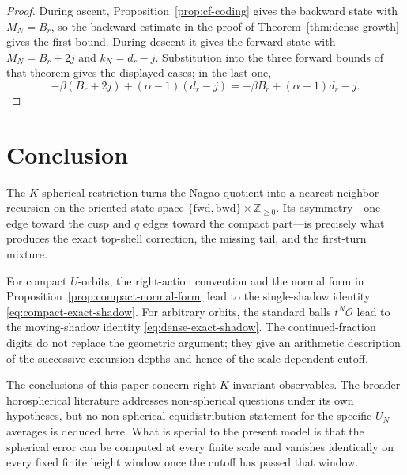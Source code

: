 \documentclass[11pt]{amsart}
\theoremstyle{definition}
\theoremstyle{plain}
\newcommand{\cO}{\mathcal O}
\newcommand{\ZZ}{\mathbb Z}
\newcommand{\fwd}{\mathrm{fwd}}
\newcommand{\bwd}{\mathrm{bwd}}
\begin{document}
\begin{proof}
During ascent, Proposition~\ref{prop:cf-coding} gives the backward state with
\(M_N=B_r\), so the backward estimate in the proof of
Theorem~\ref{thm:dense-growth} gives the first bound.  During descent it gives
the forward state with \(M_N=B_r+2j\) and \(k_N=d_r-j\).  Substitution into
the three forward bounds of that theorem gives the displayed cases; in the
last one,
\[
-\beta(B_r+2j)+(\alpha-1)(d_r-j)
=-\beta B_r+(\alpha-1)d_r-j.
\]
\end{proof}

\section{Conclusion}\label{sec:conclusion}
The \(K\)-spherical restriction turns the Nagao quotient into a nearest-neighbor
recursion on the oriented state space
\(\{\fwd,\bwd\}\times\ZZ_{\ge0}\).  Its asymmetry---one edge toward the cusp
and \(q\) edges toward the compact part---is precisely what produces the exact
top-shell correction, the missing tail, and the first-turn mixture.

For compact \(U\)-orbits, the right-action convention and the normal form in
Proposition~\ref{prop:compact-normal-form} lead to the single-shadow identity
\eqref{eq:compact-exact-shadow}.  For arbitrary orbits, the standard balls
\(t^N\cO\) lead to the moving-shadow identity
\eqref{eq:dense-exact-shadow}.  The continued-fraction digits do not replace
the geometric argument; they give an arithmetic description of the successive
excursion depths and hence of the scale-dependent cutoff.

The conclusions of this paper concern right \(K\)-invariant observables.
The broader horospherical literature addresses non-spherical questions under
its own hypotheses, but no non-spherical equidistribution statement for the
specific \(U_N\)-averages is deduced here.  What is special to the present model
is that the spherical error can be computed at every finite scale and vanishes
identically on every fixed finite height window once the cutoff has passed that
window.
\end{document}
